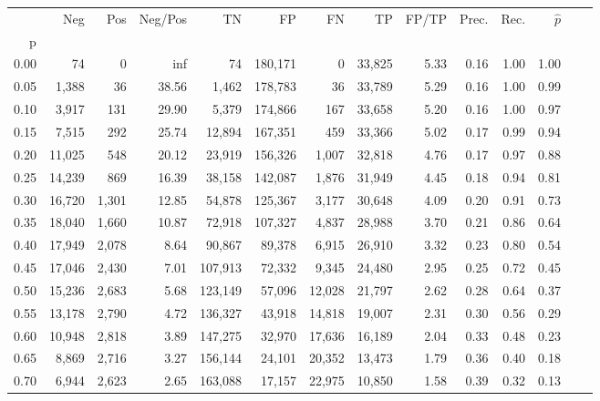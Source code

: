 \begin{tabular}{rrrrrrrrrrrrrr}
\toprule
{} &     Neg &    Pos & Neg/Pos &       TN &       FP &      FN &      TP & FP/TP & Prec. &  Rec. & $\hat{p}$ \\
p    &         &        &         &          &          &         &         &       &       &       &           \\
\midrule
0.00 &      74 &      0 &     inf &       74 &  180,171 &       0 &  33,825 &  5.33 &  0.16 &  1.00 &      1.00 \\
0.05 &   1,388 &     36 &   38.56 &    1,462 &  178,783 &      36 &  33,789 &  5.29 &  0.16 &  1.00 &      0.99 \\
0.10 &   3,917 &    131 &   29.90 &    5,379 &  174,866 &     167 &  33,658 &  5.20 &  0.16 &  1.00 &      0.97 \\
0.15 &   7,515 &    292 &   25.74 &   12,894 &  167,351 &     459 &  33,366 &  5.02 &  0.17 &  0.99 &      0.94 \\
0.20 &  11,025 &    548 &   20.12 &   23,919 &  156,326 &   1,007 &  32,818 &  4.76 &  0.17 &  0.97 &      0.88 \\
0.25 &  14,239 &    869 &   16.39 &   38,158 &  142,087 &   1,876 &  31,949 &  4.45 &  0.18 &  0.94 &      0.81 \\
0.30 &  16,720 &  1,301 &   12.85 &   54,878 &  125,367 &   3,177 &  30,648 &  4.09 &  0.20 &  0.91 &      0.73 \\
0.35 &  18,040 &  1,660 &   10.87 &   72,918 &  107,327 &   4,837 &  28,988 &  3.70 &  0.21 &  0.86 &      0.64 \\
0.40 &  17,949 &  2,078 &    8.64 &   90,867 &   89,378 &   6,915 &  26,910 &  3.32 &  0.23 &  0.80 &      0.54 \\
0.45 &  17,046 &  2,430 &    7.01 &  107,913 &   72,332 &   9,345 &  24,480 &  2.95 &  0.25 &  0.72 &      0.45 \\
0.50 &  15,236 &  2,683 &    5.68 &  123,149 &   57,096 &  12,028 &  21,797 &  2.62 &  0.28 &  0.64 &      0.37 \\
0.55 &  13,178 &  2,790 &    4.72 &  136,327 &   43,918 &  14,818 &  19,007 &  2.31 &  0.30 &  0.56 &      0.29 \\
0.60 &  10,948 &  2,818 &    3.89 &  147,275 &   32,970 &  17,636 &  16,189 &  2.04 &  0.33 &  0.48 &      0.23 \\
0.65 &   8,869 &  2,716 &    3.27 &  156,144 &   24,101 &  20,352 &  13,473 &  1.79 &  0.36 &  0.40 &      0.18 \\
0.70 &   6,944 &  2,623 &    2.65 &  163,088 &   17,157 &  22,975 &  10,850 &  1.58 &  0.39 &  0.32 &      0.13 \\

\end{tabular}
